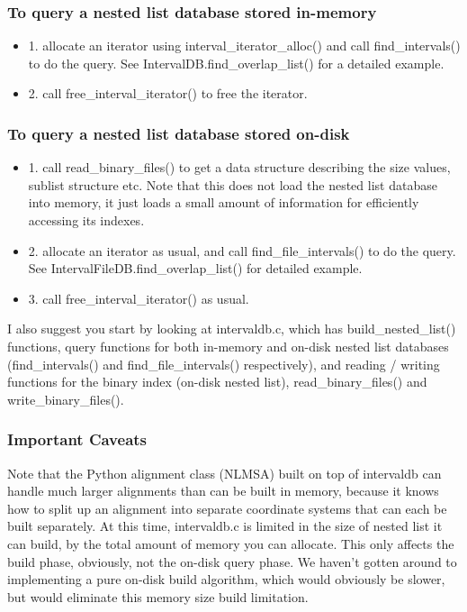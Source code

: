 \documentclass{howto}
\begin{document}
\subsubsection{To query a nested list database stored in-memory}
\begin{itemize}
\item 1. allocate an iterator using interval_iterator_alloc() and call find_intervals() to do the query.  See IntervalDB.find_overlap_list() for a detailed example.
\item 2. call free_interval_iterator() to free the iterator.
\end{itemize}

\subsubsection{To query a nested list database stored on-disk}
\begin{itemize}
\item 1. call read_binary_files() to get a data structure describing the size values, sublist structure etc.  Note that this does not load the nested list database into memory, it just loads a small amount of information for efficiently accessing its indexes.
\item 2. allocate an iterator as usual, and call find_file_intervals() to do the query.  See IntervalFileDB.find_overlap_list() for detailed example.
\item 3. call free_interval_iterator() as usual.
\end{itemize}

I also suggest you start by looking at intervaldb.c, which has build_nested_list() functions, query functions for both in-memory and on-disk nested list databases (find_intervals() and find_file_intervals() respectively), and reading / writing functions for the binary index (on-disk nested list), read_binary_files() and write_binary_files().

\subsubsection{Important Caveats}
Note that the Python alignment class (NLMSA) built on top of intervaldb can handle much larger alignments than can be built in memory, because it knows how to split up an alignment into separate coordinate systems that can each be built separately.  At this time, intervaldb.c is limited in the size of nested list it can build, by the total amount of memory you can allocate.  This only affects the build phase, obviously, not the on-disk query phase.  We haven't gotten around to implementing a pure on-disk build algorithm, which would obviously be slower, but would eliminate this memory size build limitation.
\end{document}
